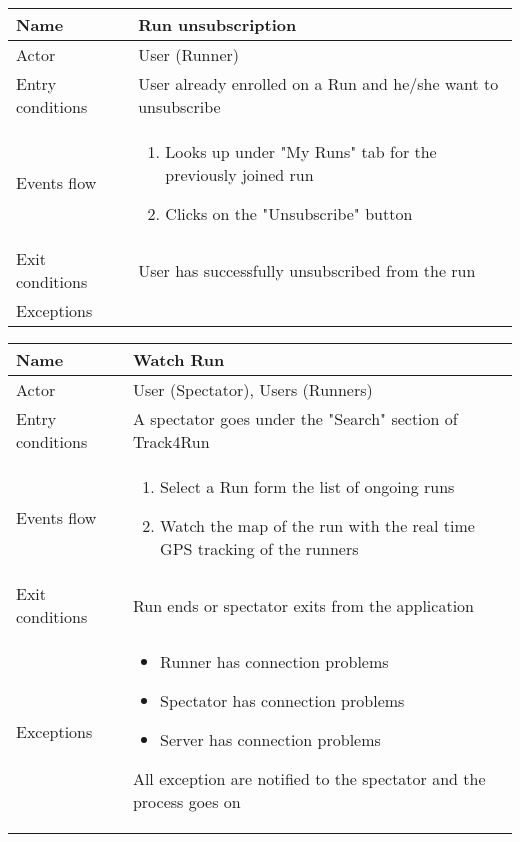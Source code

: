 \begin{table}[h!]
    \begin{tabular}{|l|p{12cm}|}
        \hline
        Name             & Run unsubscription \\ \hline
        Actor            & User (Runner) \\ \hline
        Entry conditions & User already enrolled on a Run and he/she want to unsubscribe \\ \hline
        Events flow      & 
        \begin{enumerate}
            \item Looks up under "My Runs" tab for the previously joined run
            \item Clicks on the "Unsubscribe" button
        \end{enumerate} \\ \hline
        Exit conditions  & User has successfully unsubscribed from the run \\ \hline
        Exceptions       & \\ \hline
    \end{tabular}
\end{table}

\begin{table}[h!]
    \begin{tabular}{|l|p{12cm}|}
        \hline
        Name             & Watch Run \\ \hline
        Actor            & User (Spectator), Users (Runners) \\ \hline
        Entry conditions & A spectator goes under the "Search" section of Track4Run  \\ \hline
        Events flow      & 
        \begin{enumerate}
            \item Select a Run form the list of ongoing runs
            \item Watch the map of the run with the real time GPS tracking of the runners
        \end{enumerate} \\ \hline
        Exit conditions  & Run ends or spectator exits from the application \\ \hline
        Exceptions       & 
        \begin{itemize}
            \item Runner has connection problems
            \item Spectator has connection problems
            \item Server has connection problems
        \end{itemize} All exception are notified to the spectator and the process goes on\\ \hline
    \end{tabular}
\end{table}

